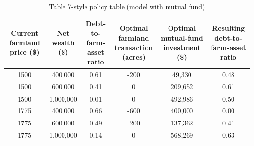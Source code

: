 \begin{table}
\caption{Table 7-style policy table (model with mutual fund)}
\label{tab:table7_mutual_makecell}
\begin{tabular}{cccccc}
\toprule
\makecell{Current farmland\\price (\$)} & \makecell{Net wealth\\(\$)} & \makecell{Debt-to-farm-asset\\ratio} & \makecell{Optimal farmland\\transaction (acres)} & \makecell{Optimal mutual-fund\\investment (\$)} & \makecell{Resulting debt-to-farm-asset\\ratio} \\
\midrule
1500 & 400,000 & 0.61 & -200 & 49,330 & 0.48 \\
1500 & 600,000 & 0.41 & 0 & 209,652 & 0.61 \\
1500 & 1,000,000 & 0.01 & 0 & 492,986 & 0.50 \\
1775 & 400,000 & 0.66 & -600 & 400,000 & 0.00 \\
1775 & 600,000 & 0.49 & -200 & 137,362 & 0.41 \\
1775 & 1,000,000 & 0.14 & 0 & 568,269 & 0.63 \\
\bottomrule
\end{tabular}
\end{table}
